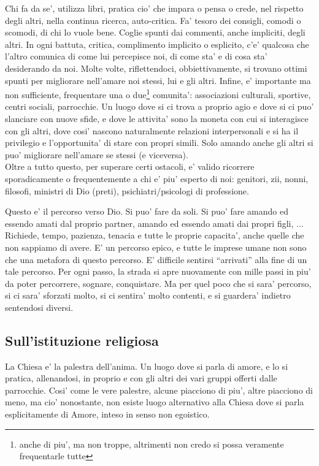 Chi fa da se', utilizza libri, pratica cio' che impara o pensa o crede, nel rispetto degli altri, nella continua ricerca, auto-critica. Fa' tesoro dei consigli, comodi o scomodi, di chi lo vuole bene.
Coglie spunti dai commenti, anche impliciti, degli altri. In ogni battuta, critica, complimento implicito o esplicito, c'e' qualcosa che l'altro comunica di come lui percepisce noi, di come sta' e di cosa sta' desiderando da noi. Molte volte, riflettendoci, obbiettivamente, si trovano ottimi spunti per migliorare nell'amare noi stessi, lui e gli altri.
Infine, e' importante ma non sufficiente, frequentare una o due\footnote{anche di piu', ma non troppe, altrimenti non credo si possa veramente frequentarle tutte} comunita': associazioni culturali, sportive, centri sociali, parrocchie. Un luogo dove si ci trova a proprio agio e dove si ci puo' slanciare con nuove sfide, e dove le attivita' sono la moneta con cui si interagisce con gli altri, dove cosi' nascono naturalmente relazioni interpersonali e si ha il privilegio e l'opportunita' di stare con propri simili. Solo amando anche gli altri si puo' migliorare nell'amare se stessi (e viceversa).\\
Oltre a tutto questo, per superare certi ostacoli, e' valido ricorrere sporadicamente o frequentemente a chi e' piu' esperto di noi: genitori, zii, nonni, filosofi, ministri di Dio (preti), psichiatri/psicologi di professione.

Questo e' il percorso verso Dio. Si puo' fare da soli. Si puo' fare amando ed essendo amati dal proprio partner, amando ed essendo amati dai propri figli, ... Richiede, tempo, pazienza, tenacia e tutte le proprie capacita', anche quelle che non sappiamo di avere. E' un percorso epico, e tutte le imprese umane non sono che una metafora di questo percorso.
E' difficile sentirsi ``arrivati'' alla fine di un tale percorso. Per ogni passo, la strada si apre nuovamente con mille passi in piu' da poter percorrere, sognare, conquistare. Ma per quel poco che si sara' percorso, si ci sara' sforzati molto, si ci sentira' molto contenti, e si guardera' indietro sentendosi diversi.


\subsection{Sull'istituzione religiosa}
La Chiesa e' la palestra dell'anima. Un luogo dove si parla di amore, e lo si pratica, allenandosi, in proprio e con gli altri dei vari gruppi offerti dalle parrocchie. Cosi' come le vere palestre, alcune piacciono di piu', altre piacciono di meno, ma cio' nonostante, non esiste luogo alternativo alla Chiesa dove si parla esplicitamente di Amore, inteso in senso non egoistico. 


